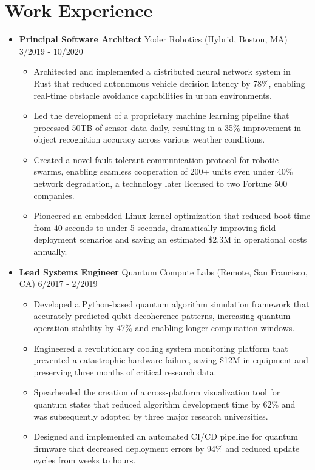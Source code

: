 \documentclass[11pt]{article}
\begin{document}
\section*{\headingfont Work Experience}

\begin{itemize}[noitemsep, topsep=0pt, itemsep=1.5em, label=]
\item \textbf{Principal Software Architect} \textperiodcentered Yoder Robotics (Hybrid, Boston, MA) \hfill 3/2019 - 10/2020

\begin{itemize}[label=›, noitemsep, topsep=0pt, leftmargin=1em]
	\item Architected and implemented a distributed neural network system in Rust that reduced autonomous vehicle decision latency by 78\%, enabling real-time obstacle avoidance capabilities in urban environments.
	\item Led the development of a proprietary machine learning pipeline that processed 50TB of sensor data daily, resulting in a 35\% improvement in object recognition accuracy across various weather conditions.
	\item Created a novel fault-tolerant communication protocol for robotic swarms, enabling seamless cooperation of 200+ units even under 40\% network degradation, a technology later licensed to two Fortune 500 companies.
	\item Pioneered an embedded Linux kernel optimization that reduced boot time from 40 seconds to under 5 seconds, dramatically improving field deployment scenarios and saving an estimated \$2.3M in operational costs annually.
\end{itemize}

\item \textbf{Lead Systems Engineer} \textperiodcentered Quantum Compute Labs (Remote, San Francisco, CA) \hfill 6/2017 - 2/2019

\begin{itemize}[label=›, noitemsep, topsep=0pt, leftmargin=1em]
	\item Developed a Python-based quantum algorithm simulation framework that accurately predicted qubit decoherence patterns, increasing quantum operation stability by 47\% and enabling longer computation windows.
	\item Engineered a revolutionary cooling system monitoring platform that prevented a catastrophic hardware failure, saving \$12M in equipment and preserving three months of critical research data.
	\item Spearheaded the creation of a cross-platform visualization tool for quantum states that reduced algorithm development time by 62\% and was subsequently adopted by three major research universities.
	\item Designed and implemented an automated CI/CD pipeline for quantum firmware that decreased deployment errors by 94\% and reduced update cycles from weeks to hours.
\end{itemize}


\end{itemize}
\end{document}
